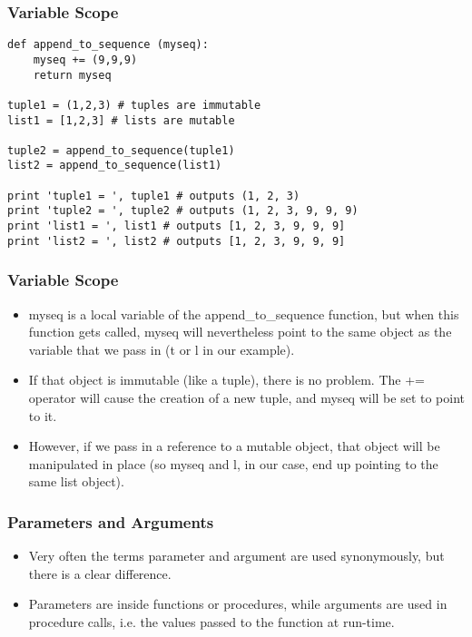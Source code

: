 \begin{frame}[fragile]\frametitle{Variable Scope}
\begin{lstlisting}
def append_to_sequence (myseq):
    myseq += (9,9,9)
    return myseq

tuple1 = (1,2,3) # tuples are immutable
list1 = [1,2,3] # lists are mutable

tuple2 = append_to_sequence(tuple1)
list2 = append_to_sequence(list1)

print 'tuple1 = ', tuple1 # outputs (1, 2, 3)
print 'tuple2 = ', tuple2 # outputs (1, 2, 3, 9, 9, 9)
print 'list1 = ', list1 # outputs [1, 2, 3, 9, 9, 9]
print 'list2 = ', list2 # outputs [1, 2, 3, 9, 9, 9]
\end{lstlisting}
  
\end{frame}

\begin{frame}[fragile]\frametitle{Variable Scope}
       \begin{itemize}
    \item  myseq is a local variable of the append\_to\_sequence function, but when this function gets called, myseq will nevertheless point to the same object as the variable that we pass in (t or l in our example).
    \item If that object is immutable (like a tuple), there is no problem. The += operator will cause the creation of a new tuple, and myseq will be set to point to it. 
    \item However, if we pass in a reference to a mutable object, that object will be manipulated in place (so myseq and l, in our case, end up pointing to the same list object).
                \end{itemize}

\end{frame}


\begin{frame}[fragile]\frametitle{Parameters and Arguments}
    \begin{itemize}
    \item Very often the terms parameter and argument are used synonymously, but there is a clear difference. 
        \item Parameters are inside functions or procedures, while arguments are used in procedure calls, i.e. the values passed to the function at run-time. 
            \end{itemize}
\end{frame}

